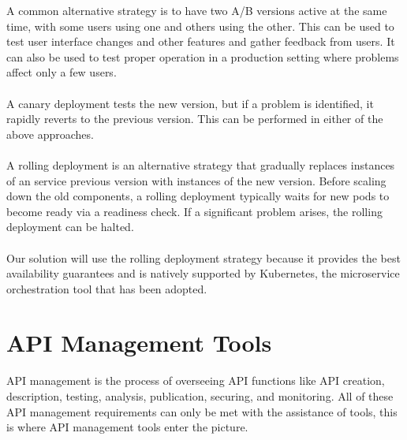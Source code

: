 A common alternative strategy is to have two A/B versions active at the same time, with some users using one and others using the other.
This can be used to test user interface changes and other features and gather feedback from users.
It can also be used to test proper operation in a production setting where problems affect only a few users.

\paragraph{}

A canary deployment tests the new version, but if a problem is identified, it rapidly reverts to the previous version.
This can be performed in either of the above approaches.

\paragraph{}

A rolling deployment is an alternative strategy that gradually replaces instances of an service previous version with instances of the new version.
Before scaling down the old components, a rolling deployment typically waits for new pods to become ready via a readiness check.
If a significant problem arises, the rolling deployment can be halted.

\paragraph{}

Our solution will use the rolling deployment strategy because it provides the best availability guarantees
and is natively supported by Kubernetes, the microservice orchestration tool that has been adopted.

\section{API Management Tools} %
\label{sec:api_management_tools}

API management is the process of overseeing API functions like API creation, description, testing, analysis, publication, securing, and monitoring.
All of these API management requirements can only be met with the assistance of tools, this is where API management tools enter the picture.

\paragraph{}

